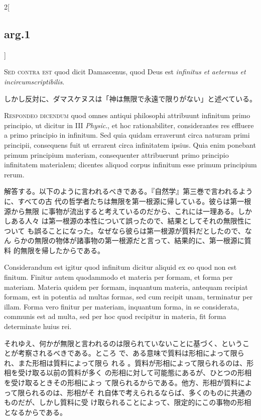 \documentclass[paper=a4paper,fontsize=10pt,jafontsize=9pt,titlepage]{jlreq}
\begin{document}
\begin{paracol}{2}[\subsection{arg.1}]
\switchcolumn*[\subsection{s.c.}]

{\scshape Sed contra est} quod dicit Damascenus, quod Deus est {\itshape infinitus
et aeternus et incircumscriptibilis}.

\switchcolumn

しかし反対に、ダマスケヌスは「神は無限で永遠で限りがない」と述べている。


{\scshape Respondeo dicendum} quod omnes antiqui philosophi attribuunt infinitum
primo principio, ut dicitur in III {\itshape Physic}., et hoc rationabiliter,
considerantes res effluere a primo principio in infinitum. Sed quia
quidam erraverunt circa naturam primi principii, consequens fuit ut
errarent  circa infinitatem ipsius. Quia enim ponebant primum principium
materiam, consequenter attribuerunt primo principio infinitatem
materialem; dicentes aliquod corpus infinitum esse primum principium
rerum.

\switchcolumn

解答する。以下のように言われるべきである。『自然学』第三巻で言われるように、すべての古
 代の哲学者たちは無限を第一根源に帰している。彼らは第一根源から無限
 に事物が流出すると考えているのだから、これには一理ある。しかしある人々
 は第一根源の本性について誤ったので、結果としてそれの無限性について
 も誤ることになった。なぜなら彼らは第一根源が質料だとしたので、なん
 らかの無限の物体が諸事物の第一根源だと言って、結果的に、第一根源に質料
 的無限を帰したからである。

\switchcolumn*

Considerandum est igitur quod infinitum dicitur aliquid ex eo quod non
est finitum. Finitur autem quodammodo et materia per formam, et forma
per materiam. Materia quidem per formam, inquantum materia, antequam
recipiat formam, est in potentia ad multas formas, sed cum recipit unam,
terminatur per illam. Forma vero finitur per materiam, inquantum forma,
in se considerata, communis est ad multa, sed per hoc quod recipitur in
materia, fit forma determinate huius rei.

\switchcolumn

それゆえ、何かが無限と言われるのは限られていないことに基づく、というこ
 とが考察されるべきである。ところ
 で、ある意味で質料は形相によって限られ、また形相は質料によって限ら
 れる 。質料が形相によって限られるのは、形相を受け取る以前の質料が多く
 の形相に対して可能態にあるが、ひとつの形相を受け取るときその形相によっ
 て限られるからである。他方、形相が質料によって限られるのは、形相がそ
 れ自体で考えられるならば、多くのものに共通のものだが、しかし質料に受
 け取られることによって、限定的にこの事物の形相となるからである。


\end{paracol}
\end{document}
